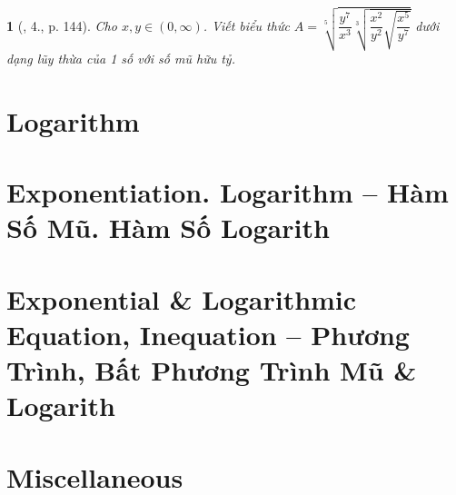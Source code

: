 \documentclass{article}
\newtheorem{baitoan}{}
\begin{document}
\begin{baitoan}[\cite{BTNC_Toan_11_DSGTXSTK}, 4., p. 144]
	Cho $x,y\in(0,\infty)$. Viết biểu thức $A = \sqrt[5]{\dfrac{y^7}{x^3}\sqrt[3]{\dfrac{x^2}{y^2}\sqrt{\dfrac{x^5}{y^7}}}}$ dưới dạng lũy thừa của 1 số với số mũ hữu tỷ.
\end{baitoan}


\section{Logarithm}


\section{Exponentiation. Logarithm -- Hàm Số Mũ. Hàm Số Logarith}


\section{Exponential \& Logarithmic Equation, Inequation -- Phương Trình, Bất Phương Trình Mũ \& Logarith}


\section{Miscellaneous}


\printbibliography[heading=bibintoc]
	
\end{document}
